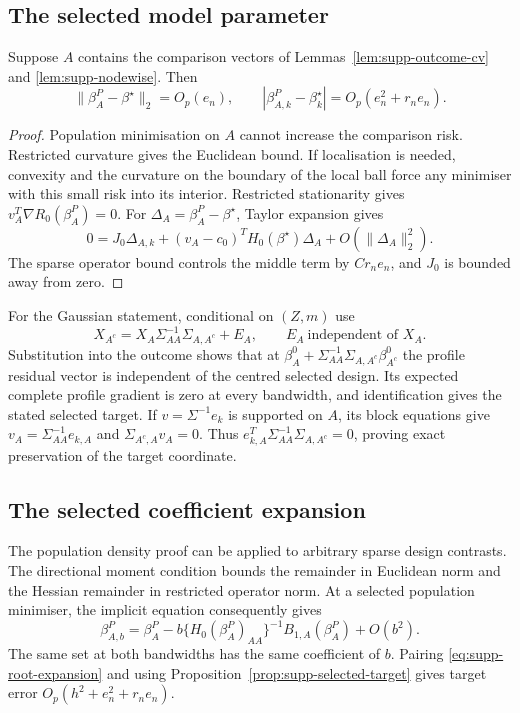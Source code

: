 \subsection{The selected model parameter}

\begin{proposition}\label{prop:supp-selected-target}
Suppose $A$ contains the comparison vectors of
Lemmas~\ref{lem:supp-outcome-cv} and \ref{lem:supp-nodewise}.
Then
\[
 \|\beta_A^P-\beta^\star\|_2=O_p(e_n),\qquad
 |\beta_{A,k}^P-\beta_k^\star|=O_p(e_n^2+r_ne_n).
\]
\end{proposition}

\begin{proof}
Population minimisation on $A$ cannot increase the comparison risk.
Restricted curvature gives the Euclidean bound. If localisation is
needed, convexity and the curvature on the boundary of the local
ball force any minimiser with this small risk into its interior.
Restricted stationarity gives $v_A^T\nabla R_0(\beta_A^P)=0$.
For $\Delta_A=\beta_A^P-\beta^\star$, Taylor expansion gives
\[
 0=J_0\Delta_{A,k}+(v_A-c_0)^TH_0(\beta^\star)\Delta_A
                              +O(\|\Delta_A\|_2^2).
\]
The sparse operator bound controls the middle term by $Cr_ne_n$,
and $J_0$ is bounded away from zero.
\end{proof}

For the Gaussian statement, conditional on $(Z,m)$ use
\[
 X_{A^c}=X_A\Sigma_{AA}^{-1}\Sigma_{A,A^c}+E_A,
 \qquad E_A\ \text{independent of }X_A.
\]
Substitution into the outcome shows that at
$\beta_A^0+\Sigma_{AA}^{-1}\Sigma_{A,A^c}\beta_{A^c}^0$ the
profile residual vector is independent of the centred selected
design. Its expected complete profile gradient is zero at every
bandwidth, and identification gives the stated selected target.
If $v=\Sigma^{-1}e_k$ is supported on $A$, its block equations give
$v_A=\Sigma_{AA}^{-1}e_{k,A}$ and
$\Sigma_{A^c,A}v_A=0$. Thus
$e_{k,A}^T\Sigma_{AA}^{-1}\Sigma_{A,A^c}=0$, proving exact
preservation of the target coordinate.

\subsection{The selected coefficient expansion}

The population density proof can be applied to arbitrary sparse
design contrasts. The directional moment condition bounds the
remainder in Euclidean norm and the Hessian remainder in restricted
operator norm. At a selected population minimiser, the implicit
equation consequently gives
\begin{equation}\label{eq:supp-root-expansion}
 \beta_{A,b}^P=\beta_A^P
       -b\{H_0(\beta_A^P)_{AA}\}^{-1}B_{1,A}(\beta_A^P)+O(b^2).
\end{equation}
The same set at both bandwidths has the same coefficient of $b$.
Pairing \eqref{eq:supp-root-expansion} and using
Proposition~\ref{prop:supp-selected-target} gives target error
$O_p(h^2+e_n^2+r_ne_n)$.


